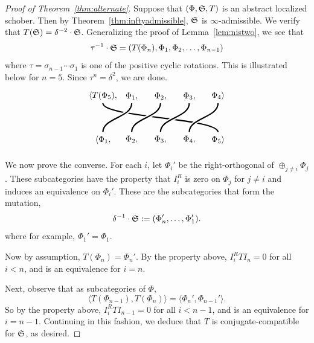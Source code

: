 \begin{proof}[Proof of Theorem~\ref{thm:alternate}]
    Suppose that $(\Phi,\mathfrak{S},T)$ is an abstract localized schober. Then by Theorem~\ref{thm:inftyadmissible}, $\mathfrak{S}$ is $\infty$-admissible. We verify that $T(\mathfrak{S}) = \delta^{-2}\cdot \mathfrak{S}$. Generalizing the proof of Lemma~\ref{lem:nistwo}, we see that
    \[\tau^{-1}\cdot\mathfrak{S} = (T(\Phi_n),\Phi_1,\Phi_2,\dots,\Phi_{n-1})\]
    where $\tau = \sigma_{n-1}\cdots\sigma_1$ is one of the positive cyclic rotations. This is illustrated below for $n=5$. Since $\tau^n = \delta^2$, we are done.
    \[\begin{tikzpicture}[scale=1.2]
        \tikzset{
            strand/.style={black, line width=1.5pt},
            mask/.style={white, line width=4.5pt}
        }

        \draw[strand] (5, 0) .. controls (5, 0.5) and (1,0.5) .. (1, 1) node[at start, below] {$\Phi_5\rangle$} node[above, black] {$\langle T(\Phi_5),$} ;

        \draw[mask] (1, 0) .. controls (1, 0.5) and (2,0.5) .. (2, 1);
        \draw[mask] (2, 0) .. controls (2, 0.5) and (3,0.5) .. (3, 1);
        \draw[mask] (3, 0) .. controls (3, 0.5) and (4,0.5) .. (4, 1);
        \draw[mask] (4, 0) .. controls (4, 0.5) and (5,0.5) .. (5, 1);
        \draw[strand] (1, 0) .. controls (1, 0.5) and (2,0.5) .. (2, 1) node[at start, below] {$\langle\Phi_1,$} node[above, black] {$\Phi_1,$};
        \draw[strand] (2, 0) .. controls (2, 0.5) and (3,0.5) .. (3, 1) node[at start, below] {$\Phi_2,$} node[above, black] {$\Phi_2,$} ;
        \draw[strand] (3, 0) .. controls (3, 0.5) and (4,0.5) .. (4, 1) node[at start, below] {$\Phi_3,$} node[above, black] {$\Phi_3,$} ;
        \draw[strand] (4, 0) .. controls (4, 0.5) and (5,0.5) .. (5, 1) node[at start, below] {$\Phi_4,$} node[above, black] {$\Phi_4\rangle$} ;
    \end{tikzpicture}\]

    We now prove the converse. For each $i$, let $\Phi_i'$ be the right-orthogonal of $\oplus_{j\neq i}\Phi_j$. These subcategories have the property that $I_i^R$ is zero on $\Phi_{j}$ for $j\neq i$ and induces an equivalence on $\Phi_i'$. These are the subcategories that form the mutation,
    \[\delta^{-1}\cdot\mathfrak{S} := (\Phi_n',\dots,\Phi_1').\]
    where for example, $\Phi_1' = \Phi_1$. 
    
    Now by assumption, $T(\Phi_n) = \Phi_n'$. By the property above, $I_i^RTI_n = 0$ for all $i<n$, and is an equivalence for $i=n$.

    Next, observe that as subcategories of $\Phi$,
    \[\langle T(\Phi_{n-1}),T(\Phi_n)\rangle = \langle \Phi_n',\Phi_{n-1}'\rangle.\]
    So by the property above, $I_i^RTI_{n-1} = 0$ for all $i<n-1$, and is an equivalence for $i=n-1$. Continuing in this fashion, we deduce that $T$ is conjugate-compatible for $\mathfrak{S}$, as desired.
\end{proof}

